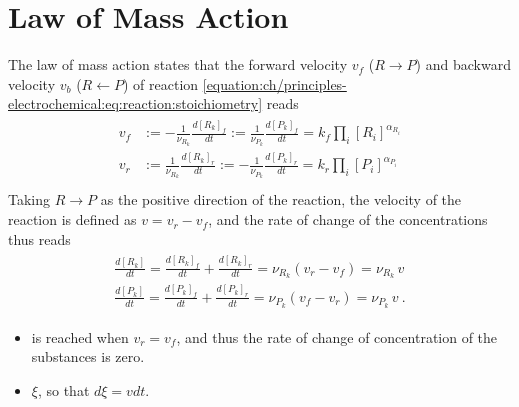 \documentclass[letterpaper,10pt,english]{jupyterBook}
\begin{document}
\section{Law of Mass Action}
\label{\detokenize{ch/principles-electrochemical:law-of-mass-action}}\label{\detokenize{ch/principles-electrochemical:physics-thermodynamics-foundation-principles-electro-chemical-law-of-mass-action}}
\sphinxAtStartPar
The law of mass action states that the forward velocity \(v_f\) (\(R \rightarrow P\)) and backward velocity \(v_b\) (\(R \leftarrow P\)) of reaction \eqref{equation:ch/principles-electrochemical:eq:reaction:stoichiometry} reads
\begin{equation*}
\begin{split}\begin{aligned}
  v_f & := -\frac{1}{\nu_{R_k}}\frac{d [ R_k ]_f}{dt} :=  \frac{1}{\nu_{P_k}}\frac{d [ P_k ]_f}{dt} = k_f \prod_i [ R_i ]^{\alpha_{R_i}} \\ 
  v_r & :=  \frac{1}{\nu_{R_k}}\frac{d [ R_k ]_r}{dt} := -\frac{1}{\nu_{P_k}}\frac{d [ P_k ]_r}{dt} = k_r \prod_i [ P_i ]^{\alpha_{P_i}} \\ 
\end{aligned}\end{split}
\end{equation*}
\sphinxAtStartPar
Taking \(R \rightarrow P\) as the positive direction of the reaction, the velocity of the reaction is defined as \(v = v_r - v_f\), and the rate of change of the concentrations thus reads
\begin{equation*}
\begin{split}\begin{aligned}
  \frac{d [ R_k ]}{dt} = \frac{d [ R_k ]_f}{dt} + \frac{d [ R_k ]_r}{dt} = \nu_{R_k} \left( v_r - v_f \right) = \nu_{R_k} \, v \\ 
  \frac{d [ P_k ]}{dt} = \frac{d [ P_k ]_f}{dt} + \frac{d [ P_k ]_r}{dt} = \nu_{P_k} \left( v_f - v_r \right) = \nu_{P_k} \, v \ .
\end{aligned}\end{split}
\end{equation*}\begin{itemize}
\item {} 
\sphinxAtStartPar
{} is reached when \(v_r = v_f\), and thus the rate of change of concentration of the substances is zero.

\item {} 
\sphinxAtStartPar
{} \(\xi\), so that \(d \xi = v dt\).

\end{itemize}
\end{document}
